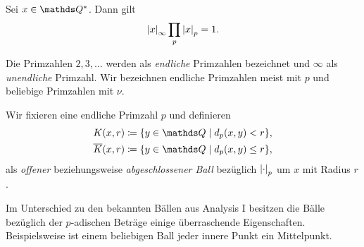 \begin{satz}[Produktformel]
Sei $x\in \Q^\ast$. Dann gilt
\begin{align*}
\left\vert x\right\vert_\infty \prod_p \left\vert x\right\vert_p=1.
\end{align*}
\end{satz}

\begin{bem}
Die Primzahlen $2,3,\dots$ werden als \emph{endliche} Primzahlen bezeichnet und $\infty$ als \emph{unendliche} Primzahl.
Wir bezeichnen endliche Primzahlen meist mit $p$ und beliebige Primzahlen mit $\nu$.
\end{bem}

\begin{defi}
Wir fixieren eine endliche Primzahl $p$ und definieren
\begin{align*}
K(x,r)\coloneqq\{y \in \Q \mid d_p(x,y)<r\},\\
\overline{K}(x,r) \coloneqq \{y\in \Q \mid d_p(x,y)\leq r\},
\end{align*}
als \emph{offener} beziehungsweise \emph{abgeschlossener Ball}
bezüglich $\left\vert\cdot\right\vert_p$ um $x$ mit Radius $r$.
\end{defi}

Im Unterschied zu den bekannten Bällen aus Analysis I besitzen die Bälle
bezüglich der $p$-adischen Beträge einige überraschende Eigenschaften.
Beispielsweise ist einem beliebigen Ball jeder innere Punkt ein Mittelpunkt.

